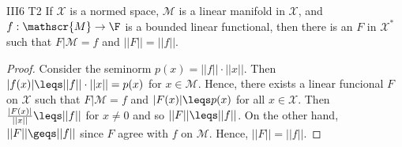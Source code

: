 \begin{exercise}{III6 T2}{}
    If $\mathscr{X}$ is a normed space, $\mathscr{M}$ is a linear manifold in $\mathscr{X}$, 
    and $f:\mathscr{M}\rightarrow \F$ is a bounded linear functional, then there is an $F$ in $\mathscr{X}^*$
    such that $F|\mathscr{M}=f$ and $||F||=||f||$.
\end{exercise}
\begin{proof}
    Consider the seminorm $p(x)=||f||\cdot ||x||$. 
    Then $|f(x)|\leqs ||f||\cdot ||x||=p(x)$ for $x\in\mathscr{M}$.
    Hence, there exists a linear funcional $F$ on $\mathscr{X}$ such that 
    $F|\mathscr{M}=f$ and $|F(x)|\leqs p(x)$ for all $x\in\mathscr{X}$.
    Then $\frac{|F(x)|}{||x||}\leqs ||f||$ for $x\neq 0$ and so $||F||\leqs ||f||$.
    On the other hand, $||F||\geqs ||f||$ since $F$ agree with $f$ on $\mathscr{M}$.
    Hence, $||F||=||f||$.
\end{proof}